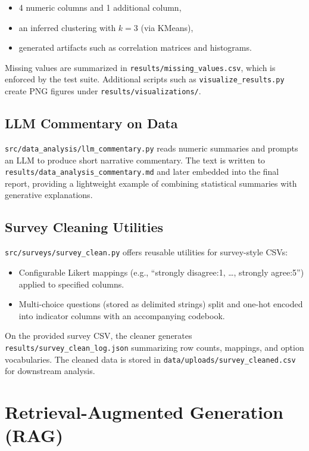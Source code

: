 \documentclass[11pt]{article}
\begin{document}
\begin{itemize}[leftmargin=1.5em]
\item 4 numeric columns and 1 additional column,
\item an inferred clustering with $k=3$ (via KMeans),
\item generated artifacts such as correlation matrices and histograms.
\end{itemize}

Missing values are summarized in \verb|results/missing_values.csv|, which is enforced by the test suite. Additional scripts such as \verb|visualize_results.py| create PNG figures under \verb|results/visualizations/|.

\subsection{LLM Commentary on Data}

\verb|src/data_analysis/llm_commentary.py| reads numeric summaries and prompts an LLM to produce short narrative commentary. The text is written to \verb|results/data_analysis_commentary.md| and later embedded into the final report, providing a lightweight example of combining statistical summaries with generative explanations.

\subsection{Survey Cleaning Utilities}

\verb|src/surveys/survey_clean.py| offers reusable utilities for survey-style CSVs:

\begin{itemize}[leftmargin=1.5em]
\item Configurable Likert mappings (e.g., ``strongly disagree:1, \dots, strongly agree:5'') applied to specified columns.
\item Multi-choice questions (stored as delimited strings) split and one-hot encoded into indicator columns with an accompanying codebook.
\end{itemize}

On the provided survey CSV, the cleaner generates \verb|results/survey_clean_log.json| summarizing row counts, mappings, and option vocabularies. The cleaned data is stored in \verb|data/uploads/survey_cleaned.csv| for downstream analysis.

\section{Retrieval-Augmented Generation (RAG)}
\end{document}

